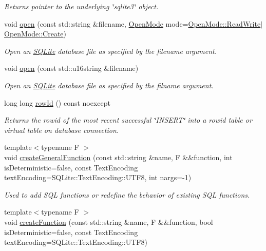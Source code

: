 \begin{DoxyCompactItemize}
\begin{DoxyCompactList}\small\item\em Returns pointer to the underlying \char`\"{}sqlite3\char`\"{} object. \end{DoxyCompactList}\item 
void \hyperlink{a00004_aec696fc408d91e582d16727adff82445}{open} (const std\-::string \&filename, \hyperlink{a00038_a0d8721ab00cfcf85ba4eed715ccfecec}{Open\-Mode} mode=\hyperlink{a00038_a0d8721ab00cfcf85ba4eed715ccfececa70a2a84088d405a2e3f1e3accaa16723}{Open\-Mode\-::\-Read\-Write}$\vert$\hyperlink{a00038_a0d8721ab00cfcf85ba4eed715ccfececa686e697538050e4664636337cc3b834f}{Open\-Mode\-::\-Create})
\begin{DoxyCompactList}\small\item\em Open an \hyperlink{a00038}{S\-Q\-Lite} database file as specified by the filename argument. \end{DoxyCompactList}\item 
void \hyperlink{a00004_ab5f3dbc9164bd435f6770f8625c0a79c}{open} (const std\-::u16string \&filename)
\begin{DoxyCompactList}\small\item\em Open an \hyperlink{a00038}{S\-Q\-Lite} database file as specified by the filname argument. \end{DoxyCompactList}\item 
long long \hyperlink{a00004_a0959fda218112d849700b7a9b58e0505}{row\-Id} () const noexcept
\begin{DoxyCompactList}\small\item\em Returns the rowid of the most recent successful \char`\"{}\-I\-N\-S\-E\-R\-T\char`\"{} into a rowid table or virtual table on database connection. \end{DoxyCompactList}\item 
{\footnotesize template$<$typename F $>$ }\\void \hyperlink{a00004_adace26a4acf443ac5c8cea3fe5c913e1}{create\-General\-Function} (const std\-::string \&name, F \&\&function, int is\-Deterministic=false, const Text\-Encoding text\-Encoding=S\-Q\-Lite\-::\-Text\-Encoding\-::\-U\-T\-F8, int nargs=-\/1)
\begin{DoxyCompactList}\small\item\em Used to add S\-Q\-L functions or redefine the behavior of existing S\-Q\-L functions. \end{DoxyCompactList}\item 
{\footnotesize template$<$typename F $>$ }\\void \hyperlink{a00004_ae8758a2e46148ba81aa18b71e17149b5}{create\-Function} (const std\-::string \&name, F \&\&function, bool is\-Deterministic=false, const Text\-Encoding text\-Encoding=S\-Q\-Lite\-::\-Text\-Encoding\-::\-U\-T\-F8)

\end{DoxyCompactItemize}
